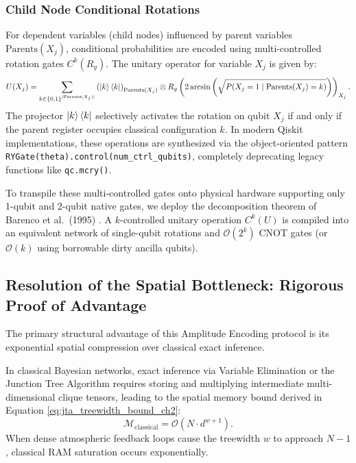 \subsubsection{Child Node Conditional Rotations}
For dependent variables (child nodes) influenced by parent variables $\mathrm{Parents}(X_j)$, conditional probabilities are encoded using multi-controlled rotation gates $C^k(R_y)$. The unitary operator for variable $X_j$ is given by:
\begin{equation}
U(X_j) = \sum_{k \in \{0,1\}^{|\mathrm{Parents}(X_j)|}} \left(\left|k\right\rangle\left\langle k\right|\right)_{\mathrm{Parents}(X_j)} \otimes R_y\left(2 \arcsin\left(\sqrt{P(X_j=1 \mid \mathrm{Parents}(X_j)=k)}\right)\right)_{X_j}.
\label{eq:child_node_multicontrolled_ry}
\end{equation}
The projector $\left|k\right\rangle\left\langle k\right|$ selectively activates the rotation on qubit $X_j$ if and only if the parent register occupies classical configuration $k$. In modern Qiskit implementations, these operations are synthesized via the object-oriented pattern \texttt{RYGate(theta).control(num\_ctrl\_qubits)}, completely deprecating legacy functions like \texttt{qc.mcry()}.

To transpile these multi-controlled gates onto physical hardware supporting only 1-qubit and 2-qubit native gates, we deploy the decomposition theorem of Barenco et al.~(1995) \cite{barenco1995}. A $k$-controlled unitary operation $C^k(U)$ is compiled into an equivalent network of single-qubit rotations and $\mathcal{O}(2^k)$ CNOT gates (or $\mathcal{O}(k)$ using borrowable dirty ancilla qubits).

\subsection{Resolution of the Spatial Bottleneck: Rigorous Proof of Advantage}
The primary structural advantage of this Amplitude Encoding protocol is its exponential spatial compression over classical exact inference.

In classical Bayesian networks, exact inference via Variable Elimination or the Junction Tree Algorithm requires storing and multiplying intermediate multi-dimensional clique tensors, leading to the spatial memory bound derived in Equation \eqref{eq:jta_treewidth_bound_ch2}:
\begin{equation}
\mathcal{M}_{\mathrm{classical}} = \mathcal{O}\left(N \cdot d^{w+1}\right).
\end{equation}
When dense atmospheric feedback loops cause the treewidth $w$ to approach $N-1$, classical RAM saturation occurs exponentially.

